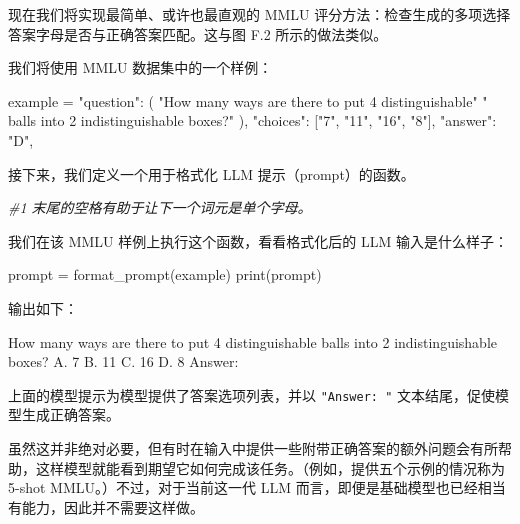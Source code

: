 现在我们将实现最简单、或许也最直观的 MMLU 评分方法：检查生成的多项选择答案字母是否与正确答案匹配。这与图 F.2 所示的做法类似。

我们将使用 MMLU 数据集中的一个样例：

\begin{codebox}
example = {
    "question": (
        "How many ways are there to put 4 distinguishable"
        " balls into 2 indistinguishable boxes?"
    ),
    "choices": ["7", "11", "16", "8"],
    "answer": "D",
}
\end{codebox}

接下来，我们定义一个用于格式化 LLM 提示（prompt）的函数。

{\noindent\small\textit{\#1 末尾的空格有助于让下一个词元是单个字母。}\par}

我们在该 MMLU 样例上执行这个函数，看看格式化后的 LLM 输入是什么样子：

\begin{codebox}
prompt = format_prompt(example)
print(prompt)
\end{codebox}

输出如下：

\begin{codebox}
How many ways are there to put 4 distinguishable balls into 2
indistinguishable boxes?
A. 7
B. 11
C. 16
D. 8
Answer:
\end{codebox}

上面的模型提示为模型提供了答案选项列表，并以 \texttt{"}\texttt{Answer: }\texttt{"} 文本结尾，促使模型生成正确答案。

虽然这并非绝对必要，但有时在输入中提供一些附带正确答案的额外问题会有所帮助，这样模型就能看到期望它如何完成该任务。（例如，提供五个示例的情况称为 5-shot MMLU。）不过，对于当前这一代 LLM 而言，即便是基础模型也已经相当有能力，因此并不需要这样做。

